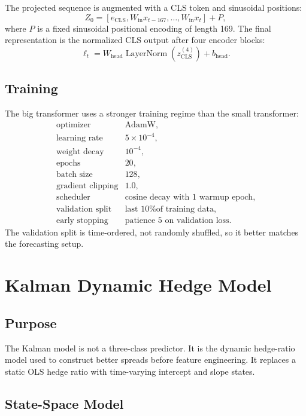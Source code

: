 \documentclass[11pt]{article}
\begin{document}
The projected sequence is augmented with a CLS token and sinusoidal positions:
\[
Z_0 = [e_{\text{CLS}}, W_{\text{in}}x_{t-167}, \ldots, W_{\text{in}}x_t] + P,
\]
where \(P\) is a fixed sinusoidal positional encoding of length 169. The final
representation is the normalized CLS output after four encoder blocks:
\[
\ell_t = W_{\text{head}}\operatorname{LayerNorm}
\left(z_{\text{CLS}}^{(4)}\right) + b_{\text{head}}.
\]

\subsection{Training}

The big transformer uses a stronger training regime than the small transformer:
\[
\begin{array}{ll}
\text{optimizer} & \text{AdamW},\\
\text{learning rate} & 5 \times 10^{-4},\\
\text{weight decay} & 10^{-4},\\
\text{epochs} & 20,\\
\text{batch size} & 128,\\
\text{gradient clipping} & 1.0,\\
\text{scheduler} & \text{cosine decay with 1 warmup epoch},\\
\text{validation split} & \text{last 10\% of training data},\\
\text{early stopping} & \text{patience 5 on validation loss}.
\end{array}
\]
The validation split is time-ordered, not randomly shuffled, so it better
matches the forecasting setup.

\section{Kalman Dynamic Hedge Model}

\subsection{Purpose}

The Kalman model is not a three-class predictor. It is the dynamic hedge-ratio
model used to construct better spreads before feature engineering. It replaces
a static OLS hedge ratio with time-varying intercept and slope states.

\subsection{State-Space Model}
\end{document}
